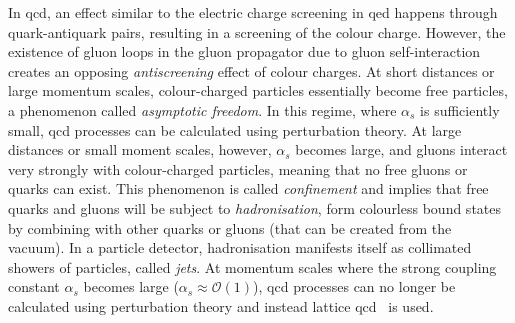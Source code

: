 In \gls{qcd}, an effect similar to the electric charge screening in \gls{qed} happens through quark-antiquark pairs, resulting in a screening of the colour charge. However, the existence of gluon loops in the gluon propagator due to gluon self-interaction creates an opposing \textit{antiscreening} effect of colour charges. At short distances or large momentum scales, colour-charged particles essentially become free particles, a phenomenon called \textit{asymptotic freedom}. In this regime, where $\alpha_s$ is sufficiently small, \gls{qcd} processes can be calculated using perturbation theory. At large distances or small moment scales, however, $\alpha_s$ becomes large, and gluons interact very strongly with colour-charged particles, meaning that no free gluons or quarks can exist. This phenomenon is called \textit{confinement} and implies that free quarks and gluons will be subject to \textit{hadronisation}, \ie form colourless bound states by combining with other quarks or gluons (that can be created from the vacuum). In a particle detector, hadronisation manifests itself as collimated showers of particles, called \textit{jets}. At momentum scales where the strong coupling constant $\alpha_s$ becomes large ($\alpha_s \approx \mathcal{O}(1)$), \gls{qcd} processes can no longer be calculated using perturbation theory and instead lattice \gls{qcd}~\cite{PhysRevD.10.2445,DeGrand:1055545} is used. 


